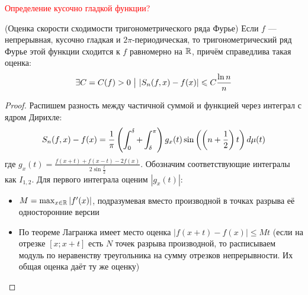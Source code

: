\begin{definition}
	\textcolor{red}{Определение кусочно гладкой функции?}
\end{definition}

\begin{theorem} (Оценка скорости сходимости тригонометрического ряда Фурье)
	Если $f$ --- непрерывная, кусочно гладкая и $2\pi$-периодическая, то тригонометрический ряд Фурье этой функции сходится к $f$ равномерно на $\mathbb{R}$, причём справедлива такая оценка:
	\[
		\exists C = C(f) > 0 \ \big|\  |S_n(f, x) - f(x)| \leqslant C\frac{\ln n}{n}
	\]
\end{theorem}

\begin{proof}
	Распишем разность между частичной суммой и функцией через интеграл с ядром Дирихле:
	\[
		S_n(f, x) - f(x) = \frac{1}{\pi} \left(\int_0^\delta + \int_\delta^\pi\right) g_x(t)\sin\left(\left(n + \frac{1}{2}\right)t\right)d\mu(t)
	\]
	где $g_x(t) = \frac{f(x + t) + f(x - t) - 2f(x)}{2\sin\frac{t}{2}}$. Обозначим соответствующие интегралы как $I_{1, 2}$. Для первого интеграла оценим $|g_x(t)|$:
	\begin{itemize}
		\item $M = \max_{x \in \mathbb{R}} |f'(x)|$, подразумевая вместо производной в точках разрыва её односторонние версии
		
		\item По теореме Лагранжа имеет место оценка $|f(x + t) - f(x)| \le Mt$ (если на отрезке $[x; x + t]$ есть $N$ точек разрыва производной, то расписываем модуль по неравенству треугольника на сумму отрезков непрерывности. Их общая оценка даёт ту же оценку)
		

\end{itemize}
\end{proof}
